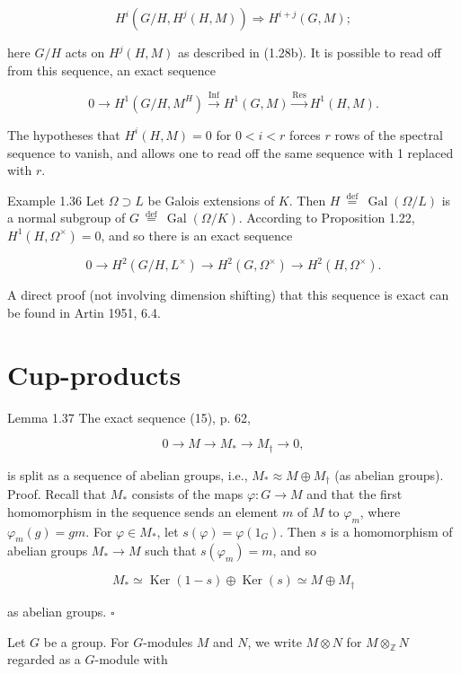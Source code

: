 \documentclass[10pt]{article}
\begin{document}
$$
H^{i}\left(G / H, H^{j}(H, M)\right) \Rightarrow H^{i+j}(G, M) ;
$$

here $G / H$ acts on $H^{j}(H, M)$ as described in (1.28b). It is possible to read off from this sequence, an exact sequence

$$
0 \rightarrow H^{1}\left(G / H, M^{H}\right) \xrightarrow{\operatorname{Inf}} H^{1}(G, M) \xrightarrow{\operatorname{Res}} H^{1}(H, M) .
$$

The hypotheses that $H^{i}(H, M)=0$ for $0<i<r$ forces $r$ rows of the spectral sequence to vanish, and allows one to read off the same sequence with 1 replaced with $r$.

Example 1.36 Let $\Omega \supset L$ be Galois extensions of $K$. Then $H \stackrel{\text { def }}{=} \operatorname{Gal}(\Omega / L)$ is a normal subgroup of $G \stackrel{\text { def }}{=} \operatorname{Gal}(\Omega / K)$. According to Proposition 1.22, $H^{1}\left(H, \Omega^{\times}\right)=0$, and so there is an exact sequence

$$
0 \rightarrow H^{2}\left(G / H, L^{\times}\right) \rightarrow H^{2}\left(G, \Omega^{\times}\right) \rightarrow H^{2}\left(H, \Omega^{\times}\right) .
$$

A direct proof (not involving dimension shifting) that this sequence is exact can be found in Artin 1951, 6.4.

\section*{Cup-products}
Lemma 1.37 The exact sequence (15), p. 62,

$$
0 \rightarrow M \rightarrow M_{*} \rightarrow M_{\dagger} \rightarrow 0,
$$

is split as a sequence of abelian groups, i.e., $M_{*} \approx M \oplus M_{\dagger}$ (as abelian groups).\\
Proof. Recall that $M_{*}$ consists of the maps $\varphi: G \rightarrow M$ and that the first homomorphism in the sequence sends an element $m$ of $M$ to $\varphi_{m}$, where $\varphi_{m}(g)=g m$. For $\varphi \in M_{*}$, let $s(\varphi)=\varphi\left(1_{G}\right)$. Then $s$ is a homomorphism of abelian groups $M_{*} \rightarrow M$ such that $s\left(\varphi_{m}\right)=m$, and so

$$
M_{*} \simeq \operatorname{Ker}(1-s) \oplus \operatorname{Ker}(s) \simeq M \oplus M_{\dagger}
$$

as abelian groups. \(\square\)

Let $G$ be a group. For $G$-modules $M$ and $N$, we write $M \otimes N$ for $M \otimes_{\mathbb{Z}} N$ regarded as a $G$-module with
\end{document}
